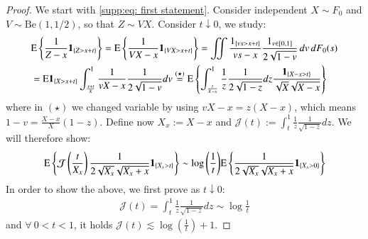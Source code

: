 			\begin{proof}
			We start with \eqref{supp:eq: first statement}. Consider independent $X \sim F_0$ and $V \sim \text{Be}(1,1/2)$, so that $Z \sim VX$. Consider $t \downarrow 0$, we study:
			\begin{align*}
			& \mathrm{E}\left\{\frac{1}{Z-x} \mathbf{1}_{\{Z>x+t\}}\right\}=\mathrm{E}\left\{\frac{1}{V X - x} \mathbf{1}_{\{V X>x+t\}}\right\}= \iint \frac{ 1_{\{v s>x+t\}} }{v s-x}\frac{{1}_{v \in [0,1]} }{2 \sqrt{1-v}} \, d v \, d F_0(s) \\
			& =\mathrm{E} \mathbf{1}_{\{X>x+t\}} \int_{\frac{x+t}{X}}^1 \frac{1}{v X -x} \frac{1}{2 \sqrt{1-v}} d v \stackrel{(\star)}{=} \mathrm{E} \left\{ \int_{\frac{t}{X-x}}^1 \frac{1}{z} \frac{1}{2 \sqrt{1-z}} d z \frac{\mathbf{1}_{\{X-x > t\}}}{\sqrt{X} \sqrt{X-x}} \right\} 
			\end{align*}
			where in $(\star)$ we changed variable by using $vX-x = z(X-x)$, which means $1-v = \frac{X-x}{X}(1-z)$. Define now $X_x := X-x$ and $\mathcal{J}(t) := \int_{t}^{1} \frac{1}{z} \frac{1}{\sqrt{1-z}} dz$. We will therefore show:
			\begin{align*}
				\mathrm{E}\left\{ \mathcal{J}\left(\frac{t}{X_x}\right) \frac{1}{2\sqrt{X_x} \sqrt{X_x + x}} \mathbf{1}_{\{X_x > t \}} \right\} \sim \log{ \left( \frac{1}{t} \right) }\mathrm{E}\left\{\frac{1}{2\sqrt{X_x} \sqrt{X_x + x}} \mathbf{1}_{\{X_x > 0 \}} \right\}
			\end{align*}
			In order to show the above, we first prove as $t \downarrow 0$:
			\begin{align*}
				\mathcal{J}(t) = \int_{t}^{1} \frac{1}{z} \frac{1}{\sqrt{1-z}} dz \sim \log{\frac{1}{t}}
			\end{align*}
			and $\forall \: 0 < t < 1$, it holds $\mathcal{J}(t) \lesssim \log{\left( \frac{1}{t}\right)} + 1$. 
			

\end{proof}

